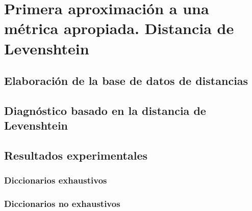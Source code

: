\chapter{Primera aproximación a una métrica apropiada. Distancia de Levenshtein}
\label{ch:Levenshtein}

\lettrine[lraise=-0.1, lines=2, loversize=0.2]{}{}



\section{Elaboración de la base de datos de distancias}
\label{sec:LevenDist}


\section{Diagnóstico basado en la distancia de Levenshtein}
\label{sec:LevenCands}


\section{Resultados experimentales}
\label{sec:LevenResults}


\subsection{Diccionarios exhaustivos}
\label{subsec:LevDicExhaust}


\subsection{Diccionarios no exhaustivos}
\label{subsec:LevDicNoExhaust}


\endinput

